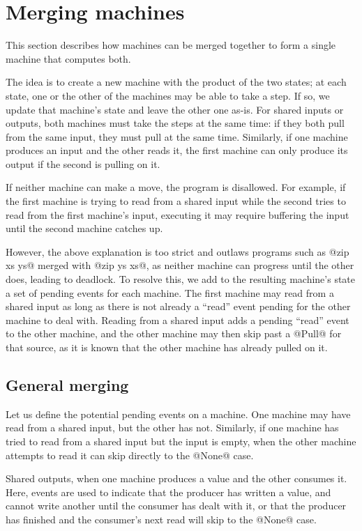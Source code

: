 \section{Merging machines}
\label{s:Merging}

This section describes how machines can be merged together to form a single machine that computes both.

The idea is to create a new machine with the product of the two states; at each state, one or the other of the machines may be able to take a step.
If so, we update that machine's state and leave the other one as-is.
For shared inputs or outputs, both machines must take the steps at the same time: if they both pull from the same input, they must pull at the same time.
Similarly, if one machine produces an input and the other reads it, the first machine can only produce its output if the second is pulling on it.

If neither machine can make a move, the program is disallowed.
For example, if the first machine is trying to read from a shared input while the second tries to read from the first machine's input, executing it may require buffering the input until the second machine catches up.

However, the above explanation is too strict and outlaws programs such as @zip xs ys@ merged with @zip ys xs@, as neither machine can progress until the other does, leading to deadlock.
To resolve this, we add to the resulting machine's state a set of pending events for each machine.
The first machine may read from a shared input as long as there is not already a ``read'' event pending for the other machine to deal with.
Reading from a shared input adds a pending ``read'' event to the other machine, and the other machine may then skip past a @Pull@ for that source, as it is known that the other machine has already pulled on it.

\subsection{General merging}
Let us define the potential pending events on a machine.
One machine may have read from a shared input, but the other has not.
Similarly, if one machine has tried to read from a shared input but the input is empty, when the other machine attempts to read it can skip directly to the @None@ case.

Shared outputs, when one machine produces a value and the other consumes it.
Here, events are used to indicate that the producer has written a value, and cannot write another until the consumer has dealt with it, or that the producer has finished and the consumer's next read will skip to the @None@ case.

